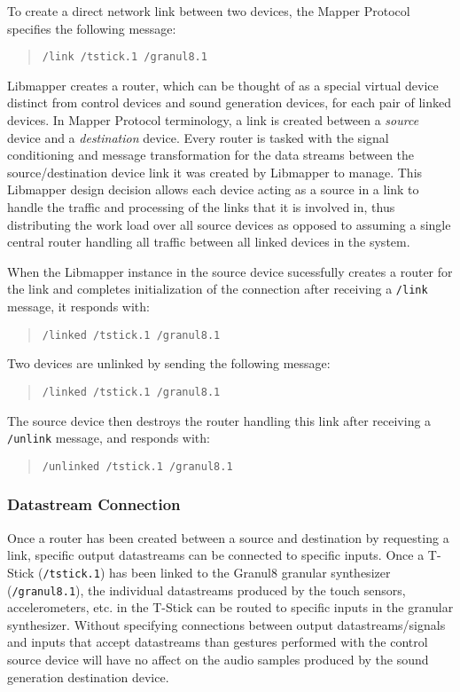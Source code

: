 To create a direct network link between two devices, the Mapper Protocol specifies the following message:

\begin{quote}
\verb#/link /tstick.1 /granul8.1#
\end{quote}

Libmapper creates a router, which can be thought of as a special virtual device distinct from control devices and sound generation devices, for each pair of linked devices. In Mapper Protocol terminology, a link is created between a \emph{source} device and a \emph{destination} device. Every router is tasked with the signal conditioning and message transformation for the data streams between the source/destination device link it was created by Libmapper to manage. This Libmapper design decision allows each device acting as a source in a link to handle the traffic and processing of the links that it is involved in, thus distributing the work load over all source devices as opposed to assuming a single central router handling all traffic between all linked devices in the system.

When the Libmapper instance in the source device sucessfully creates a router for the link and completes initialization of the connection after receiving a \verb#/link# message, it responds with:

\begin{quote}
\verb#/linked /tstick.1 /granul8.1#
\end{quote}

Two devices are unlinked by sending the following message:

\begin{quote}
\verb#/linked /tstick.1 /granul8.1#
\end{quote}

The source device then destroys the router handling this link after receiving a \verb#/unlink# message, and responds with:

\begin{quote}
\verb#/unlinked /tstick.1 /granul8.1#
\end{quote}

\subsubsection{Datastream Connection}

Once a router has been created between a source and destination by requesting a link, specific output datastreams can be connected to specific inputs. Once a T-Stick (\verb#/tstick.1#) has been linked to the Granul8 granular synthesizer (\verb#/granul8.1#), the individual datastreams produced by the touch sensors, accelerometers, etc. in the T-Stick can be routed to specific inputs in the granular synthesizer. Without specifying connections between output datastreams/signals and inputs that accept datastreams than gestures performed with the control source device will have no affect on the audio samples produced by the sound generation destination device. 

